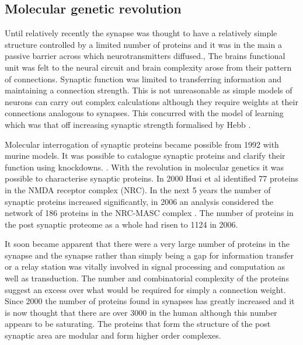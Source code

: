 \subsection{Molecular genetic revolution}
 Until relatively recently the synapse was thought to have a relatively simple structure controlled by a limited number of proteins and it was in the main a passive barrier across which neurotransmitters diffused.\cite{grant2019synapse}, \cite{lisman1994cam}  The brains functional unit was felt to the neural circuit and brain complexity arose from their pattern of connections. Synaptic function was limited to transferring information and maintaining a connection strength. This is not unreasonable as simple models of neurons can carry out complex calculations although they require weights at their connections analogous to synapses. This concurred with the model of learning which was that off increasing synaptic strength formalised by Hebb \cite{hebb1949organization_check}.
 
 Molecular interrogation of synaptic proteins became possible from 1992 with murine models. It was possible to catalogue synaptic proteins and clarify their function using knockdowns.  \cite{grant1992impaired}\cite{silva1992impaired}.  With the revolution in molecular genetics it was possible to characterise synaptic proteins. In 2000 Husi et al \cite{husi2000proteomic} identified 77 proteins in the NMDA receptor complex (NRC). In the next 5 years the number of synaptic proteins increased significantly, in 2006 an analysis considered the network of 186 proteins in the NRC-MASC complex \cite{pocklington2006proteomes}. The number of proteins in the post synaptic proteome as a whole had risen to 1124 in 2006\cite{collins2006molecular}.
 
 It soon became apparent that there were a very large number of proteins in the synapse and the synapse rather than simply being a gap for information transfer or a relay station was vitally involved in signal processing and computation as well as transduction. The number and combinatorial complexity of the proteins suggest an excess over what would be required for simply a connection weight.  Since 2000 the number of proteins found in synapses has greatly increased and it is now thought that there are over 3000 in the human although this number appears to be saturating. \cite{heil2018systems}  The proteins that form the structure of the post synaptic area are modular and form higher order complexes\cite{pocklington2006proteomes}\cite{zhu2016mechanistic}\cite{frank2016nmda}.

